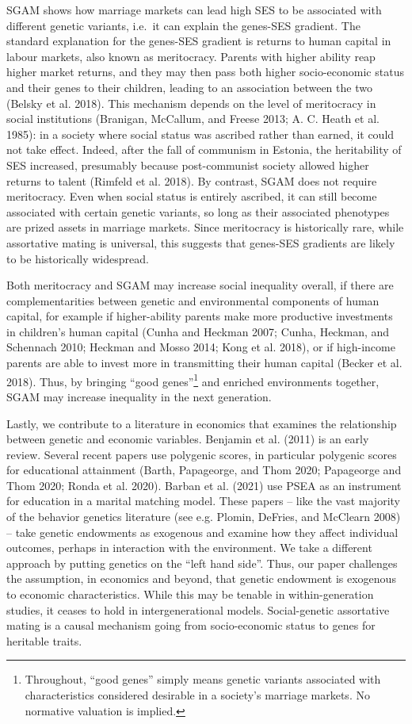 \documentclass[
  12pt,
]{article}
\theoremstyle{definition}
\theoremstyle{definition}
\theoremstyle{definition}
\theoremstyle{definition}
\theoremstyle{remark}
\begin{document}
SGAM shows how marriage markets can lead high SES to be associated with
different genetic variants, i.e.~it can explain the genes-SES gradient. The
standard explanation for the genes-SES gradient is returns to human capital
in labour markets, also known as meritocracy. Parents with higher ability reap
higher market returns, and they may then pass both higher socio-economic status
and their genes to their children, leading to an association between the two
(Belsky et al. 2018). This mechanism depends on the level of meritocracy in
social institutions (Branigan, McCallum, and Freese 2013; A. C. Heath et al. 1985): in a society where
social status was ascribed rather than earned, it could not take effect. Indeed,
after the fall of communism in Estonia, the heritability of SES increased,
presumably because post-communist society allowed higher returns to talent
(Rimfeld et al. 2018). By contrast, SGAM does not require meritocracy. Even when
social status is entirely ascribed, it can still become associated with certain
genetic variants, so long as their associated phenotypes are prized assets in
marriage markets. Since meritocracy is historically rare, while assortative
mating is universal, this suggests that genes-SES gradients are likely to be
historically widespread.

Both meritocracy and SGAM may increase social inequality overall, if there are
complementarities between genetic and environmental components of human capital,
for example if higher-ability parents make more productive investments in
children's human capital (Cunha and Heckman 2007; Cunha, Heckman, and Schennach 2010; Heckman and Mosso 2014; Kong et al. 2018), or if high-income parents are able to
invest more in transmitting their human capital (Becker et al. 2018). Thus, by
bringing ``good genes''\footnote{Throughout, ``good genes'' simply means genetic variants
  associated with characteristics considered desirable in a society's marriage
  markets. No normative valuation is implied.} and enriched environments together, SGAM may
increase inequality in the next generation.

Lastly, we contribute to a literature in economics that examines the
relationship between genetic and economic variables. Benjamin et al. (2011) is an
early review. Several recent papers use polygenic scores, in particular
polygenic scores for educational attainment (Barth, Papageorge, and Thom 2020; Papageorge and Thom 2020; Ronda et al. 2020). Barban et al. (2021) use PSEA as an
instrument for education in a marital matching model. These papers --
like the vast majority of the behavior genetics literature (see e.g. Plomin, DeFries, and McClearn 2008) -- take genetic endowments as exogenous and examine how
they affect individual outcomes, perhaps in interaction with the environment. We
take a different approach by putting genetics on the ``left hand side''. Thus, our
paper challenges the assumption, in economics and beyond, that genetic endowment
is exogenous to economic characteristics. While this may be tenable in
within-generation studies, it ceases to hold in intergenerational models.
Social-genetic assortative mating is a causal mechanism going from
socio-economic status to genes for heritable traits.
\end{document}
